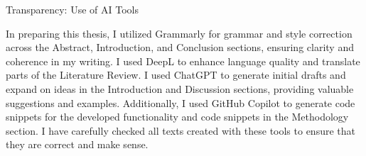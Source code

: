 \thispagestyle{empty}

\vspace*{20mm}

\begin{center}
    { Transparency: Use of AI Tools}
\end{center}

\vspace{10mm}

In preparing this thesis, I utilized Grammarly for grammar and style correction across the Abstract, Introduction, and Conclusion sections, ensuring clarity and coherence in my writing. I used DeepL to enhance language quality and translate parts of the Literature Review. I used ChatGPT to generate initial drafts and expand on ideas in the Introduction and Discussion sections, providing valuable suggestions and examples. Additionally, I used GitHub Copilot to generate code snippets for the developed functionality and code snippets in the Methodology section. I have carefully checked all texts created with these tools to ensure that they are correct and make sense.

\cleardoublepage{}
